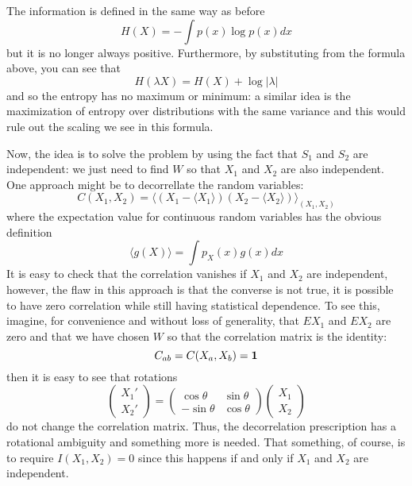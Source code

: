 \documentclass[12pt]{article}
\begin{document}
The information is defined in the same way as before
\begin{equation} 
H(X)=-\int  p(x)\log{p(x)} dx 
\end{equation} 
but it is no longer always positive. Furthermore, by substituting from
the formula above, you can see that
\begin{equation} 
H(\lambda X)=H(X)+\log{|\lambda|} 
\end{equation} 
and so the entropy has no maximum or minimum: a similar idea is the
maximization of entropy over distributions with the same variance and
this would rule out the scaling we see in this formula.

Now, the idea is to solve the problem by using the fact that $S_1$ and
$S_2$ are independent: we just need to find $W$ so that $X_1$ and
$X_2$ are also independent. One approach might be to decorrellate the
random variables:
\begin{equation}
C(X_1,X_2)=\langle(X_1-\langle X_1\rangle)(X_2-\langle X_2\rangle)\rangle_{(X_1,X_2)}
\end{equation}
where the expectation value for continuous random variables has the obvious definition
\begin{equation}
\langle g(X)\rangle =\int p_X(x)g(x) dx
\end{equation}
It is easy to check that the correlation vanishes if $X_1$ and $X_2$
are independent, however, the flaw in this approach is that the
converse is not true, it is possible to have zero correlation while
still having statistical dependence. To see this, imagine, for
convenience and without loss of generality, that $EX_1$ and $EX_2$ are
zero and that we have chosen $W$ so that the correlation matrix is the
identity:
\begin{equation}
C_{ab}=C(X_a,X_b)={\bf 1}
\end{equation}
then it is easy to see that rotations
\begin{equation}
\left(\begin{array}{c}X_1'\\X_2'\end{array}\right)=\left(\begin{array}{cc}\cos{\theta}&\sin{\theta}\\-\sin{\theta}&\cos{\theta}\end{array}\right)\left(\begin{array}{c}X_1\\X_2\end{array}\right)
\end{equation}
do not change the correlation matrix. Thus, the decorrelation
prescription has a rotational ambiguity and something more is
needed. That something, of course, is to require $I(X_1,X_2)=0$ since
this happens if and only if $X_1$ and $X_2$ are independent.
\end{document}
